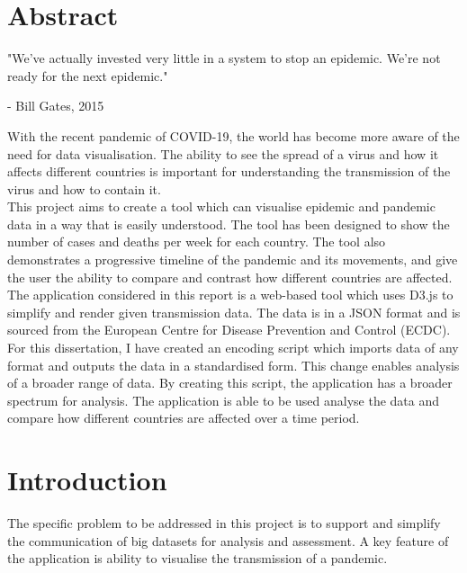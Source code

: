 \documentclass{report}
\begin{document}
\chapter{Abstract}
\begin{center}
    \LARGE{"We've actually invested very little in a system to stop an epidemic. We're not ready for the next epidemic."}
\end{center}
\begin{flushright}
    \large{- Bill Gates, 2015 \cite{gates:2015}}
\end{flushright}
With the recent pandemic of COVID-19, the world has become more aware of the need for data visualisation. The ability to see the spread of a virus and how it affects different countries is important for understanding the transmission of the virus and how to contain it.\\
This project aims to create a tool which can visualise epidemic and pandemic data in a way that is easily understood. The tool has been designed to show the number of cases and deaths per week for each country. The tool also demonstrates a progressive timeline of the pandemic and its movements, and give the user the ability to compare and contrast how different countries are affected.\\
The application considered in this report is a web-based tool which uses D3.js to simplify and render given transmission data. The data is in a JSON format and is sourced from the European Centre for Disease Prevention and Control (ECDC). For this dissertation, I have created an encoding script which imports data of any format and outputs the data in a standardised form. This change enables analysis of a broader range of data. By creating this script, the application has a broader spectrum for analysis.
The application is able to be used analyse the data and compare how different countries are affected over a time period.

\newpage
\chapter{Introduction}
The specific problem to be addressed in this project is to support and simplify the communication of big datasets for analysis and assessment. A key feature of the application is ability to visualise the transmission of a pandemic.\\
\end{document}

